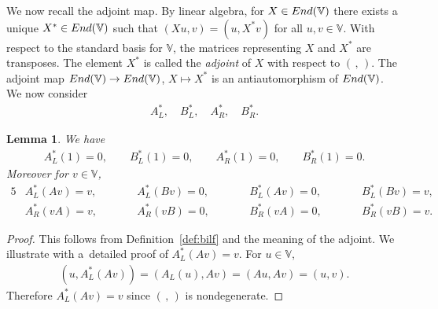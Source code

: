 \documentclass[11pt]{article}
\numberwithin{equation}{section}
\numberwithin{equation}{section}
\newtheorem{Lemma}[Theorem]{Lemma}
\begin{document}
{We now recall the adjoint map. By linear algebra,
for $X \in {\rm End}(\mathbb V)$ there exists a unique
$X^* \in {\rm End}(\mathbb V)$ such that
$(Xu,v) = (u, X^*v)$ for all $u,v \in \mathbb V$.
With respect to the standard basis for $\mathbb V$, the matrices representing
$X$ and $X^*$ are transposes.
The element $X^*$ is called the {\it adjoint} of $X$ with
respect to
$(\, ,\,)$.
The adjoint map
${\rm End}(\mathbb V) \to
{\rm End}(\mathbb V)$,
$X \mapsto X^*$ is an antiautomorphism of
${\rm End}(\mathbb V)$.
We now consider
\begin{gather}
A^*_L, \quad
B^*_L, \quad
A^*_R, \quad
B^*_R.\label{eq:ABLR}
\end{gather}

\begin{Lemma}\label{lem:Asaction}We have
\begin{gather}
A^*_L(1)=0, \qquad
B^*_L(1)=0, \qquad
A^*_R(1)=0, \qquad
B^*_R(1)=0.\label{eq:ABaction}
\end{gather}
Moreover for $v \in \mathbb V$,
\begin{alignat*}{5}
& A^*_L(Av) = v,\qquad &&
A^*_L(Bv) = 0,\qquad &&
B^*_L(Av) = 0,\qquad &&
B^*_L(Bv) = v, &\\
 &A^*_R(vA) = v,\qquad &&
A^*_R(vB) = 0,\qquad &&
B^*_R(vA) = 0,\qquad &&
B^*_R(vB) = v. &
\end{alignat*}
\end{Lemma}
\begin{proof} This follows from
Definition~\ref{def:bilf}
and the meaning of the adjoint.
We illustrate with a~detailed proof of $A^*_L(Av)=v$.
For $u \in \mathbb V$,
\begin{gather*}
(u, A^*_L(Av)) = (A_L(u), Av) = (Au,Av)=(u,v).
\end{gather*}
Therefore $A^*_L(Av)=v$ since $(\,,\,)$ is nondegenerate.
\end{proof}

}
\end{document}
